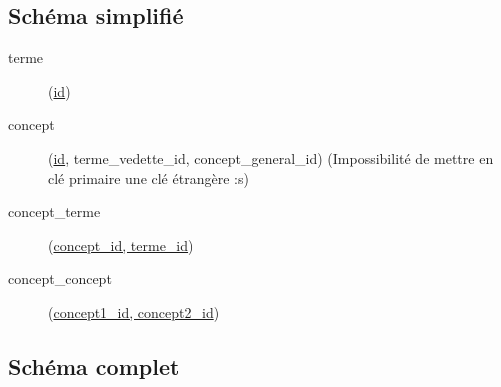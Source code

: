 \subsection{Schéma simplifié}
\begin{description}
\item[terme](\underline{id})
\item[concept](\underline{id}, terme\_vedette\_id\up{\#}, concept\_general\_id\up{\#}) (Impossibilité de mettre en clé primaire une clé étrangère :s)
\item[concept\_terme](\underline{concept\_id\up{\#}, terme\_id\up{\#}})
\item[concept\_concept](\underline{concept1\_id\up{\#}, concept2\_id\up{\#}})
\end{description}

\subsection{Schéma complet}
